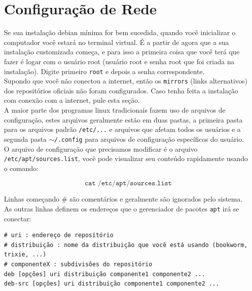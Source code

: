 \documentclass[12pt,a4paper]{article}
\begin{document}
\section{Configuração de Rede}

\hspace{\baselineskip}

Se sua instalação debian mínima for bem sucedida, quando você inicializar o computador você estará no terminal virtual. É a partir de agora que a sua instalação customizada começa, e para isso a primeira coisa que você terá que fazer é logar com o usuário root (usuário root e senha root que foi criada na instalação). Digite primeiro \texttt{root} e depois a senha correspondente.\\

Supondo que você não conectou a internet, então os \texttt{mirrors} (links alternativos) dos repositórios oficiais não foram configurados. Caso tenha feita a instalação com conexão com a internet, pule esta seção.\\

A maior parte dos programas linux tradicionais fazem uso de arquivos de configuração, estes arquivos geralmente estão em duas pastas, a primeira pasta para os arquivos padrão \texttt{/etc/...} e arquivos que afetam todos os usuários e a segunda pasta \texttt{$\sim$/.config} para arquivos de configuração específicos do usuário.\\ 

O arquivo de configuração que precisamos modificar é o arquivo \texttt{/etc/apt/sources.list}, você pode visualizar seu conteúdo rapidamente usando o comando: 

$$ \texttt{cat /etc/apt/sources.list} $$

Linhas começando \# são comentários e geralmente são ignorados pelo sistema. As outras linhas definem os endereços que o gerenciador de pacotes \texttt{apt} irá se conectar: \\

\begin{lstlisting}
# uri : endereço de repositório
# distribuição : nome da distribuição que você está usando (bookworm, trixie, ...)
# componenteX : subdivisões do repositório 
deb [opções] uri distribuição componente1 componente2 ...
deb-src [opções] uri distribuição componente1 componente2 ...   
\end{lstlisting}

\vspace{\baselineskip}
\end{document}
